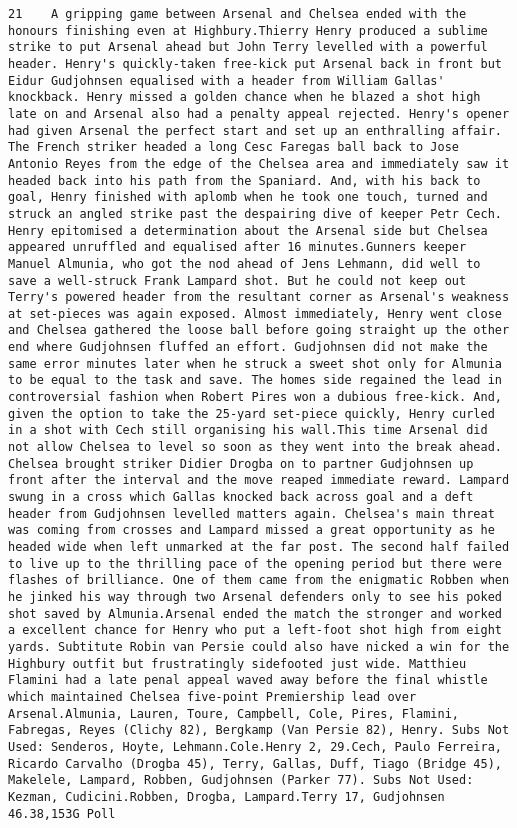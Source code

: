 \documentclass[11pt]{article}
\begin{document}
\begin{Verbatim}[commandchars=\\\{\}]
         21    A gripping game between Arsenal and Chelsea ended with the honours finishing even at Highbury.Thierry Henry produced a sublime strike to put Arsenal ahead but John Terry levelled with a powerful header. Henry's quickly-taken free-kick put Arsenal back in front but Eidur Gudjohnsen equalised with a header from William Gallas' knockback. Henry missed a golden chance when he blazed a shot high late on and Arsenal also had a penalty appeal rejected. Henry's opener had given Arsenal the perfect start and set up an enthralling affair. The French striker headed a long Cesc Faregas ball back to Jose Antonio Reyes from the edge of the Chelsea area and immediately saw it headed back into his path from the Spaniard. And, with his back to goal, Henry finished with aplomb when he took one touch, turned and struck an angled strike past the despairing dive of keeper Petr Cech. Henry epitomised a determination about the Arsenal side but Chelsea appeared unruffled and equalised after 16 minutes.Gunners keeper Manuel Almunia, who got the nod ahead of Jens Lehmann, did well to save a well-struck Frank Lampard shot. But he could not keep out Terry's powered header from the resultant corner as Arsenal's weakness at set-pieces was again exposed. Almost immediately, Henry went close and Chelsea gathered the loose ball before going straight up the other end where Gudjohnsen fluffed an effort. Gudjohnsen did not make the same error minutes later when he struck a sweet shot only for Almunia to be equal to the task and save. The homes side regained the lead in controversial fashion when Robert Pires won a dubious free-kick. And, given the option to take the 25-yard set-piece quickly, Henry curled in a shot with Cech still organising his wall.This time Arsenal did not allow Chelsea to level so soon as they went into the break ahead. Chelsea brought striker Didier Drogba on to partner Gudjohnsen up front after the interval and the move reaped immediate reward. Lampard swung in a cross which Gallas knocked back across goal and a deft header from Gudjohnsen levelled matters again. Chelsea's main threat was coming from crosses and Lampard missed a great opportunity as he headed wide when left unmarked at the far post. The second half failed to live up to the thrilling pace of the opening period but there were flashes of brilliance. One of them came from the enigmatic Robben when he jinked his way through two Arsenal defenders only to see his poked shot saved by Almunia.Arsenal ended the match the stronger and worked a excellent chance for Henry who put a left-foot shot high from eight yards. Subtitute Robin van Persie could also have nicked a win for the Highbury outfit but frustratingly sidefooted just wide. Matthieu Flamini had a late penal appeal waved away before the final whistle which maintained Chelsea five-point Premiership lead over Arsenal.Almunia, Lauren, Toure, Campbell, Cole, Pires, Flamini, Fabregas, Reyes (Clichy 82), Bergkamp (Van Persie 82), Henry. Subs Not Used: Senderos, Hoyte, Lehmann.Cole.Henry 2, 29.Cech, Paulo Ferreira, Ricardo Carvalho (Drogba 45), Terry, Gallas, Duff, Tiago (Bridge 45), Makelele, Lampard, Robben, Gudjohnsen (Parker 77). Subs Not Used: Kezman, Cudicini.Robben, Drogba, Lampard.Terry 17, Gudjohnsen 46.38,153G Poll 
\end{Verbatim}
\end{document}

